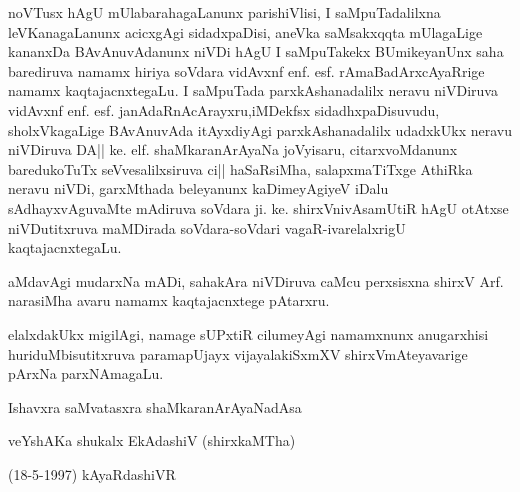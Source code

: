 noVTusx hAgU mUlabarahagaLanunx parishiVlisi, I saMpuTadalilxna leVKanagaLanunx acicxgAgi sidadxpaDisi, aneVka saMsakxqqta mUlagaLige kananxDa BAvAnuvAdanunx niVDi hAgU I saMpuTakekx BUmikeyanUnx saha barediruva namamx hiriya soVdara vidAvxnf enf. esf. rAmaBadArxcAyaRrige namamx kaqtajacnxtegaLu. I saMpuTada parxkAshanadalilx neravu niVDiruva vidAvxnf enf. esf. janAdaRnAcArayxru,\break iMDekfsx sidadhxpaDisuvudu, sholxVkagaLige BAvAnuvAda itAyxdiyAgi parxkAshanadalilx udadxkUkx neravu niVDiruva DA|| ke. elf. shaMkaranArAyaNa joVyisaru, citarxvoMdanunx baredukoTuTx seVvesalilxsiruva ci|| haSaRsiMha, salapxmaTiTxge AthiRka neravu niVDi, garxMthada beleyanunx kaDimeyAgiyeV iDalu sAdhayxvAguvaMte mAdiruva soVdara ji. ke. shirxVnivAsamUtiR hAgU otAtxse niVDutitxruva maMDirada soVdara-soVdari vagaR-ivarelalxrigU kaqtajacnxtegaLu.

aMdavAgi mudarxNa mADi, sahakAra niVDiruva caMcu perxsisxna shirxV Arf. narasiMha avaru namamx kaqtajacnxtege pAtarxru.

elalxdakUkx migilAgi, namage sUPxtiR cilumeyAgi namamxnunx anugarxhisi huriduMbisutitxruva paramapUjayx vijayalakiSxmXV shirxVmAteyavarige pArxNa parxNAmagaLu.


Ishavxra saMvatasxra \hfill shaMkaranArAyaNadAsa

veYshAKa shukalx EkAdashiV \hfill (shirxkaMTha)

{(\rm 18-5-1997)} \hfill kAyaRdashiVR
